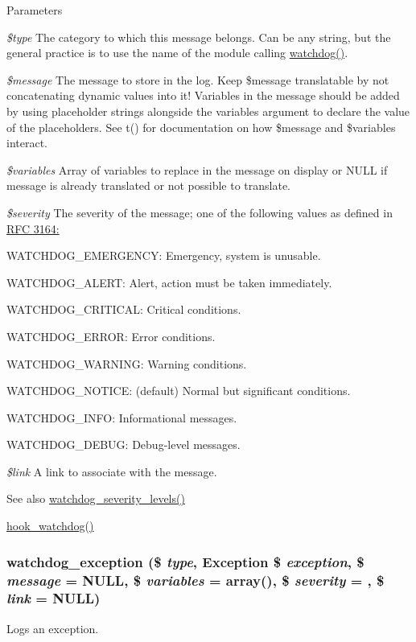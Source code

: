 \begin{DoxyParams}{Parameters}
\item[{\em \$type}]The category to which this message belongs. Can be any string, but the general practice is to use the name of the module calling \hyperlink{bootstrap_8inc_acb7338e6740302727043d64e3ae1257b}{watchdog()}. \item[{\em \$message}]The message to store in the log. Keep \$message translatable by not concatenating dynamic values into it! Variables in the message should be added by using placeholder strings alongside the variables argument to declare the value of the placeholders. See t() for documentation on how \$message and \$variables interact. \item[{\em \$variables}]Array of variables to replace in the message on display or NULL if message is already translated or not possible to translate. \item[{\em \$severity}]The severity of the message; one of the following values as defined in \hyperlink{}{RFC 3164: }
\begin{DoxyItemize}
\item WATCHDOG\_\-EMERGENCY: Emergency, system is unusable.
\item WATCHDOG\_\-ALERT: Alert, action must be taken immediately.
\item WATCHDOG\_\-CRITICAL: Critical conditions.
\item WATCHDOG\_\-ERROR: Error conditions.
\item WATCHDOG\_\-WARNING: Warning conditions.
\item WATCHDOG\_\-NOTICE: (default) Normal but significant conditions.
\item WATCHDOG\_\-INFO: Informational messages.
\item WATCHDOG\_\-DEBUG: Debug-\/level messages. 
\end{DoxyItemize}\item[{\em \$link}]A link to associate with the message.\end{DoxyParams}
\begin{DoxySeeAlso}{See also}
\hyperlink{group__logging__severity__levels_gafb5d4b58ec7e483153644c0f664e0ca4}{watchdog\_\-severity\_\-levels()} 

\hyperlink{group__hooks_gab2b8bf0289fad4b39485e933012f290c}{hook\_\-watchdog()} 
\end{DoxySeeAlso}
\hypertarget{bootstrap_8inc_aba38f35647efce6b4099dc59131e216b}{
\subsubsection[{watchdog\_\-exception}]{\setlength{\rightskip}{0pt plus 5cm}watchdog\_\-exception (\$ {\em type}, \/  {\bf Exception} \$ {\em exception}, \/  \$ {\em message} = {\ttfamily NULL}, \/  \$ {\em variables} = {\ttfamily array()}, \/  \$ {\em severity} = {}, \/  \$ {\em link} = {\ttfamily NULL})}}
\label{bootstrap_8inc_aba38f35647efce6b4099dc59131e216b}
Logs an exception.

